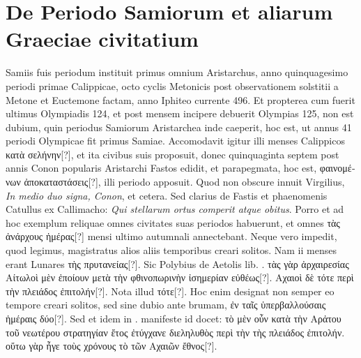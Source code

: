 \section{De Periodo Samiorum et aliarum Graeciae civitatium}
Samiis fuis periodum instituit primus omnium Aristarchus, anno
quinquagesimo periodi primae Calippicae, octo cyclis Metonicis
post observationem solstitii a Metone et Euctemone factam,
anno Iphiteo currente 496.
Et propterea cum fuerit ultimus Olympiadis
124, et post mensem incipere debuerit Olympias 125, non est
dubium, quin periodus Samiorum Aristarchea inde caeperit, hoc est,
ut annus 41 periodi Olympicae fit primus Samiae.
Accomodavit igitur
illi menses Calippicos \textgreek{κατὰ σελήνην[?]},
 et ita civibus suis proposuit, donec
quinquaginta septem post annis Conon popularis Aristarchi
Fastos edidit, et parapegmata, hoc est,
 \textgreek{φαινομένων ἀποκαταστάσεις[?]}, illi periodo
apposuit.
Quod non obscure innuit Virgilius, \textit{In medio duo signa,
Conon}, et cetera.
Sed clarius de Fastis et phaenomenis Catullus ex Callimacho:
\textit{Qui stellarum ortus comperit atque obitus}.
Porro et ad hoc
exemplum reliquae omnes civitates suas periodos habuerunt, et omnes
\textgreek{τὰς ἀνάρχους ἡμέρας[?]} mensi ultimo autumnali annectebant.
Neque
vero impedit, quod legimus, magistratus alios aliis temporibus
creari solitos.
%
Nam ii menses erant Lunares \textgreek{τὴς πρυτανείας[?]}.
Sic Polybius
de Aetolis lib. .
 \textgreek{τὰς γὰρ ἀρχαιρεσίας Αίτωλοὶ μὲν ἐποίουν μετὰ
τὴν φθινοπωρινὴν ἰσημερίαν εὐθέως[?]}.
\textgreek{Αχαιοὶ δὲ τότε περὶ τὴν πλειάδος ἐπιτολήν[?]}.
Nota illud \textgreek{τότε[?]}.
Hoc enim designat non semper eo tempore
creari solitos, sed sine dubio ante brumam,
 \textgreek{ἐν ταῖς ὑπερβαλλούσαις ἡμέραις
δύο[?]}.
Sed et idem in . manifeste id docet:
 \textgreek{τὸ μὲν οὖν κατὰ τὴν
Αρἀτου τοῦ νεωτέρου στρατηγίαν ἔτος ἐτύγχανε διεληλυθὸς
 περὶ τὴν τὴς πλειάδος ἐπιτολήν}.
\textgreek{οὕτω γὰρ ἦγε τοὺς χρόνους τὸ τῶν Αχαιῶν ἔθνος[?]}.
